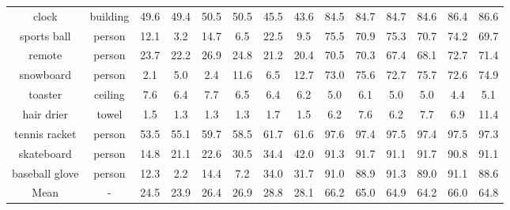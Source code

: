 \begin{table}[h]
{\begin{tabular}{|cc|cc|cc|cc|cc|cc|cc|}
clock & building & 49.6 & 49.4 & 50.5 & 50.5 & 45.5 & 43.6 & 84.5 & 84.7 & 84.7 & 84.6 & 86.4 & 86.6 \\ 
sports ball & person & 12.1 & 3.2 & 14.7 & 6.5 & 22.5 & 9.5 & 75.5 & 70.9 & 75.3 & 70.7 & 74.2 & 69.7 \\ 
remote & person & 23.7 & 22.2 & 26.9 & 24.8 & 21.2 & 20.4 & 70.5 & 70.3 & 67.4 & 68.1 & 72.7 & 71.4 \\ 
snowboard & person & 2.1 & 5.0 & 2.4 & 11.6 & 6.5 & 12.7 & 73.0 & 75.6 & 72.7 & 75.7 & 72.6 & 74.9 \\ 
toaster & ceiling & 7.6 & 6.4 & 7.7 & 6.5 & 6.4 & 6.2 & 5.0 & 6.1 & 5.0 & 5.0 & 4.4 & 5.1 \\ 
hair drier & towel & 1.5 & 1.3 & 1.3 & 1.3 & 1.7 & 1.5 & 6.2 & 7.6 & 6.2 & 7.7 & 6.9 & 11.4 \\ 
tennis racket & person & 53.5 & 55.1 & 59.7 & 58.5 & 61.7 & 61.6 & 97.6 & 97.4 & 97.5 & 97.4 & 97.5 & 97.3 \\ 
skateboard & person & 14.8 & 21.1 & 22.6 & 30.5 & 34.4 & 42.0 & 91.3 & 91.7 & 91.1 & 91.7 & 90.8 & 91.1 \\ 
baseball glove & person & 12.3 & 2.2 & 14.4 & 7.2 & 34.0 & 31.7 & 91.0 & 88.9 & 91.3 & 89.0 & 91.1 & 88.6 \\ 
\hline
Mean & - & 24.5 & 23.9 & 26.4 & 26.9 & 28.8 & 28.1 & 66.2 & 65.0 & 64.9 & 64.2 & 66.0 & 64.8 \\ 
\hline
\end{tabular}
}
\end{table}

